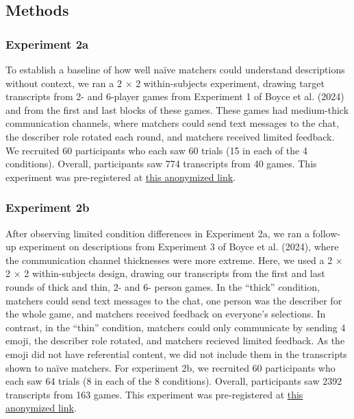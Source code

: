 \documentclass[10pt, letterpaper]{article}
\begin{document}
\subsection{Methods}\label{methods-1}

\subsubsection{Experiment 2a}\label{experiment-2a}

To establish a baseline of how well naïve matchers could understand
descriptions without context, we ran a 2 \(\times\) 2 within-subjects
experiment, drawing target transcripts from 2- and 6-player games from
Experiment 1 of Boyce et al. (2024) and from the first and last blocks
of these games. These games had medium-thick communication channels,
where matchers could send text messages to the chat, the describer role
rotated each round, and matchers received limited feedback. We recruited
60 participants who each saw 60 trials (15 in each of the 4 conditions).
Overall, participants saw 774 transcripts from 40 games. This experiment
was pre-registered at
\href{https://osf.io/k45dr/?view_only=1f4bbadb8e6b4b5f8d04cf04392967dd}{this
anonymized link}.

\subsubsection{Experiment 2b}\label{experiment-2b}

After observing limited condition differences in Experiment 2a, we ran a
follow-up experiment on descriptions from Experiment 3 of Boyce et al.
(2024), where the communication channel thicknesses were more extreme.
Here, we used a 2 \(\times\) 2 \(\times\) 2 within-subjects design,
drawing our transcripts from the first and last rounds of thick and
thin, 2- and 6- person games. In the ``thick'' condition, matchers could
send text messages to the chat, one person was the describer for the
whole game, and matchers received feedback on everyone's selections. In
contrast, in the ``thin'' condition, matchers could only communicate by
sending 4 emoji, the describer role rotated, and matchers recieved
limited feedback. As the emoji did not have referential content, we did
not include them in the transcripts shown to naïve matchers. For
experiment 2b, we recruited 60 participants who each saw 64 trials (8 in
each of the 8 conditions). Overall, participants saw 2392 transcripts
from 163 games. This experiment was pre-registered at
\href{https://osf.io/rdp5k/?view_only=87452ac1a7894f98b51b5642346e9e3d}{this
anonymized link}.
\end{document}
